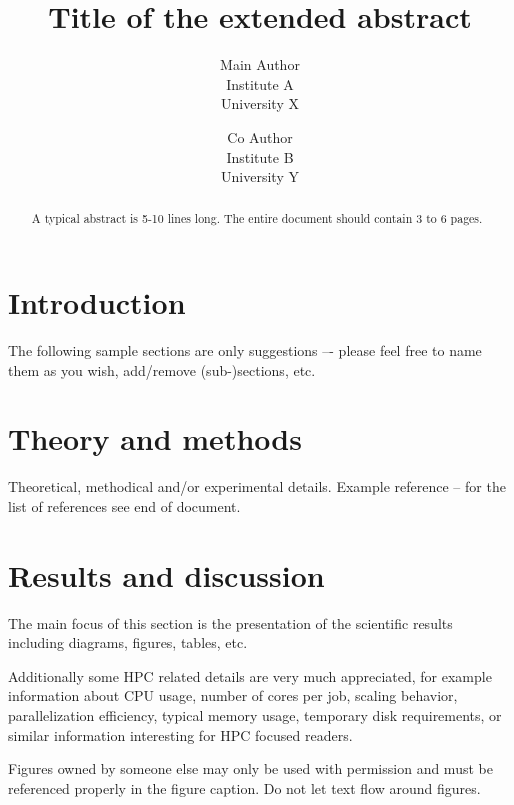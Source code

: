 \documentclass[fontsize=11pt,a4paper]{article}
\title{Title of the extended abstract}
\author{
        Main Author \\
        Institute A \\
        University X
            \and
        Co Author \\
        Institute B \\
        University Y
}
\date{}
\begin{document}
\maketitle

%
%

\begin{abstract}
A typical abstract is 5-10 lines long. The entire document should contain 3 to 6 pages.
\end{abstract}

\section{Introduction}\label{introduction}

The following sample sections are only suggestions –- please feel free to name
them as you wish, add/remove (sub-)sections, etc.

\section{Theory and methods}\label{theory}

Theoretical, methodical and/or experimental details. Example
reference \cite{muster} -- for the list of references see end of document.

\section{Results and discussion}\label{results}

The main focus of this section is the presentation of the scientific results
including diagrams, figures, tables, etc.

Additionally some HPC related details are very much appreciated, for example
information about CPU usage, number of cores per job, scaling behavior,
parallelization efficiency, typical memory usage, temporary disk requirements,
or similar information interesting for HPC focused readers.

%
%

Figures owned by someone else may only be used with permission and must be
referenced properly in the figure caption. Do not let text flow around figures.

\end{document}
